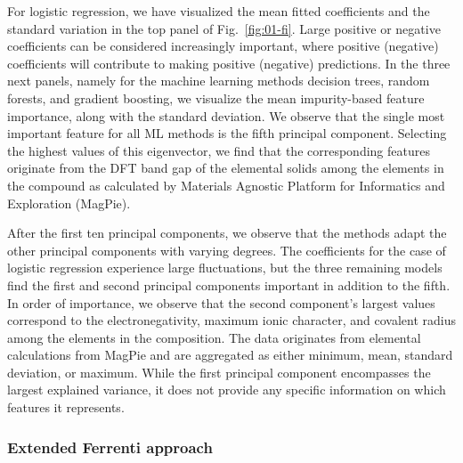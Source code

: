 \documentclass[superscriptaddress,unsortedaddress,
 amsmath,amssymb,
 aps,
]{revtex4-2}
\begin{document}
For logistic regression, we have visualized the mean fitted coefficients and the standard variation in the top panel of Fig.~\ref{fig:01-fi}. Large positive or negative coefficients can be considered increasingly important, where positive (negative) coefficients will contribute to making positive (negative) predictions. In the three next panels, namely for the machine learning methods  decision trees, random forests, and gradient boosting, we visualize the mean impurity-based feature importance, along with the standard deviation. We observe that the single most important feature for all ML methods is the fifth principal component. Selecting the highest values of this eigenvector, we find that the corresponding features originate from the DFT band gap of the elemental solids among the elements in the compound as calculated by Materials Agnostic Platform for Informatics and Exploration (MagPie). 

After the first ten principal components, we observe that the methods adapt the other principal components with varying degrees. The coefficients for the case of logistic regression experience large fluctuations, but the three remaining models find the first and second principal components important in addition to the fifth. In order of importance, we observe that the second component's largest values correspond to the electronegativity, maximum ionic character, and covalent radius among the elements in the composition. The data originates from elemental calculations from MagPie and are aggregated as either minimum, mean, standard deviation, or maximum. While the first principal component encompasses the largest explained variance, it does not provide any specific information on which features it represents.



\subsubsection*{Extended Ferrenti approach}
\end{document}
